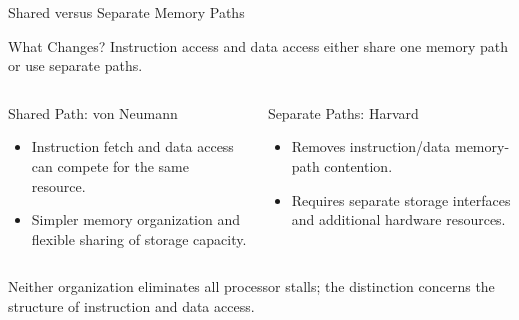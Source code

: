 \documentclass[aspectratio=169,11pt,t]{beamer}
\begin{document}

\begin{frame}{Shared versus Separate Memory Paths}

\begin{block}{What Changes?}
Instruction access
and data access
either share one memory path
or use separate paths.
\end{block}

\vspace{0.35cm}

\begin{columns}[T,onlytextwidth]


\begin{block}{Shared Path: von Neumann}

\begin{itemize}
  \item Instruction fetch
        and data access
        can compete for
        the same resource.
  \item Simpler memory organization
        and flexible sharing
        of storage capacity.
\end{itemize}

\end{block}


\begin{block}{Separate Paths: Harvard}

\begin{itemize}
  \item Removes instruction/data
        memory-path contention.
  \item Requires separate storage interfaces
        and additional hardware resources.
\end{itemize}

\end{block}

\end{columns}

\vspace{0.25cm}

Neither organization
eliminates all processor stalls;
the distinction concerns
the structure of instruction
and data access.

\end{frame}
\end{document}
